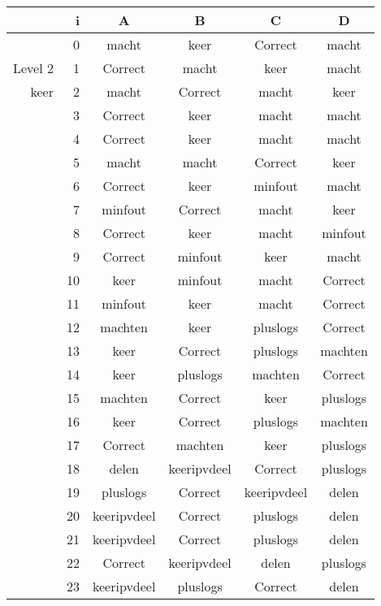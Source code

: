 \begin{tabular}{ rr| c|c|c|c}\hline\hline
     & i & \textbf{A} & \textbf{B} & \textbf{C} & \textbf{D}\\\hline

&0&macht&keer&Correct\cellcolor[gray]{0.6}&macht\\
Level 2 & 1&Correct\cellcolor[gray]{0.6}&macht&keer&macht\\
keer &2&macht&Correct\cellcolor[gray]{0.6}&macht&keer\\
&3&Correct\cellcolor[gray]{0.6}&keer&macht&macht\\
&4&Correct\cellcolor[gray]{0.6}&keer&macht&macht\\
&5&macht&macht&Correct\cellcolor[gray]{0.6}&keer\\
&6&Correct\cellcolor[gray]{0.6}&keer&minfout&macht\\
&7&minfout&Correct\cellcolor[gray]{0.6}&macht&keer\\
&8&Correct\cellcolor[gray]{0.6}&keer&macht&minfout\\
&9&Correct\cellcolor[gray]{0.6}&minfout&keer&macht\\
&10&keer&minfout&macht&Correct\cellcolor[gray]{0.6}\\
&11&minfout&keer&macht&Correct\cellcolor[gray]{0.6}\\
&12&machten&keer&pluslogs&Correct\cellcolor[gray]{0.6}\\
&13&keer&Correct\cellcolor[gray]{0.6}&pluslogs&machten\\
&14&keer&pluslogs&machten&Correct\cellcolor[gray]{0.6}\\
&15&machten&Correct\cellcolor[gray]{0.6}&keer&pluslogs\\
&16&keer&Correct\cellcolor[gray]{0.6}&pluslogs&machten\\
&17&Correct\cellcolor[gray]{0.6}&machten&keer&pluslogs\\
&18&delen&keeripvdeel&Correct\cellcolor[gray]{0.6}&pluslogs\\
&19&pluslogs&Correct\cellcolor[gray]{0.6}&keeripvdeel&delen\\
&20&keeripvdeel&Correct\cellcolor[gray]{0.6}&pluslogs&delen\\
&21&keeripvdeel&Correct\cellcolor[gray]{0.6}&pluslogs&delen\\
&22&Correct\cellcolor[gray]{0.6}&keeripvdeel&delen&pluslogs\\
&23&keeripvdeel&pluslogs&Correct\cellcolor[gray]{0.6}&delen\\
\hline\end{tabular}\par\ \newline

